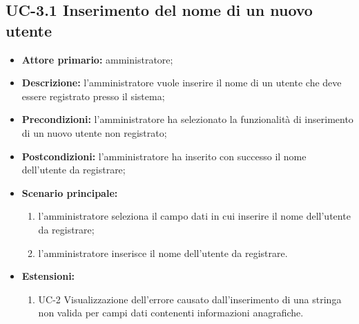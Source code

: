 \subsection{UC-3.1 Inserimento del nome di un nuovo utente}
\begin{itemize}
	\item \textbf{Attore primario:} amministratore;

	\item \textbf{Descrizione:} l'amministratore vuole inserire il nome di un utente che deve essere registrato presso il sistema;

	\item \textbf{Precondizioni:} l'amministratore ha selezionato la funzionalità di inserimento di un nuovo utente non registrato;

	\item \textbf{Postcondizioni:} l'amministratore ha inserito con successo il nome dell'utente da registrare;

	\item \textbf{Scenario principale:}
	      \begin{enumerate}
		      \item l'amministratore seleziona il campo dati in cui inserire il nome dell'utente da registrare;
		      \item l'amministratore inserisce il nome dell'utente da registrare.
	      \end{enumerate}
	\item \textbf{Estensioni:}
	      \begin{enumerate}
		      \item UC-2 Visualizzazione dell'errore causato dall'inserimento di una stringa non valida per campi dati contenenti informazioni anagrafiche.
	      \end{enumerate}
\end{itemize}


